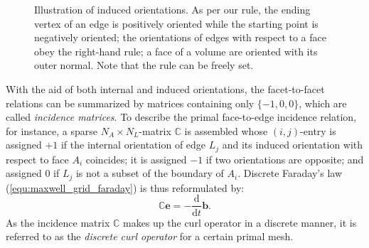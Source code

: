 \documentclass{report}
\begin{document}
\begin{figure}
    \caption{Illustration of induced orientations. As per our rule, the ending vertex of an edge is positively oriented while the starting point is negatively oriented; the orientations of edges with respect to a face obey the right-hand rule; a face of a volume are oriented with its outer normal. Note that the rule can be freely set.}
    \label{fig:illustration_external_orientation}
\end{figure}

With the aid of both internal and induced orientations, the facet-to-facet relations can be summarized by matrices containing only $\{-1,0,0\}$, which are called \emph{incidence matrices}. To describe the primal face-to-edge incidence relation, for instance, a sparse $N_A \times N_L$-matrix $\mathbb{C}$ is assembled whose $(i,j)$-entry is assigned $+1$ if the internal orientation of edge $L_j$ and its induced orientation with respect to face $A_i$ coincides; it is assigned $-1$ if two orientations are opposite; and assigned $0$ if $L_j$ is not a subset of the boundary of $A_i$. Discrete Faraday's law (\ref{equ:maxwell_grid_faraday}) is thus reformulated by:
\begin{equation*}
    \mathbb{C}\mathbf{e} = - \frac{\text{d}}{\text{d}t} \mathbf{b}.
\end{equation*}
As the incidence matrix $\mathbb{C}$ makes up the curl operator in a discrete manner, it is referred to as the \emph{discrete curl operator} for a certain primal mesh.
\end{document}
